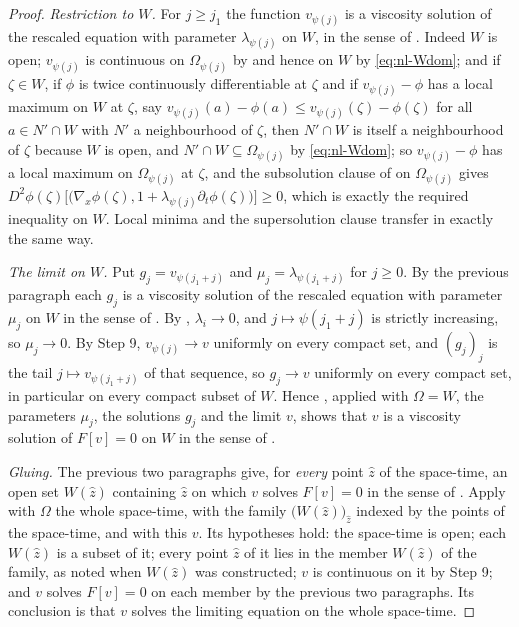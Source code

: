 \begin{proof}
\emph{Restriction to $W$.} For $j\ge j_1$ the function $v_{\psi(j)}$ is a
viscosity solution of the rescaled equation with parameter $\lambda_{\psi(j)}$ on
$W$, in the sense of . Indeed $W$ is open;
$v_{\psi(j)}$ is continuous on $\Omega_{\psi(j)}$ by
 and hence on $W$ by \eqref{eq:nl-Wdom}; and if
$\zeta\in W$, if $\phi$ is twice continuously differentiable at $\zeta$ and if
$v_{\psi(j)}-\phi$ has a local maximum on $W$ at $\zeta$, say
$v_{\psi(j)}(a)-\phi(a)\le v_{\psi(j)}(\zeta)-\phi(\zeta)$ for all
$a\in N'\cap W$ with $N'$ a neighbourhood of $\zeta$, then $N'\cap W$ is itself a
neighbourhood of $\zeta$ because $W$ is open, and $N'\cap W\subseteq
\Omega_{\psi(j)}$ by \eqref{eq:nl-Wdom}; so $v_{\psi(j)}-\phi$ has a local
maximum on $\Omega_{\psi(j)}$ at $\zeta$, and the subsolution clause of
 on $\Omega_{\psi(j)}$ gives
$D^2\phi(\zeta)\bigl[\bigl(\nabla_x\phi(\zeta),
1+\lambda_{\psi(j)}\partial_t\phi(\zeta)\bigr)\bigr]\ge0$, which is exactly the
required inequality on $W$.
Local minima and the supersolution clause transfer in exactly the same way.

\emph{The limit on $W$.} Put $g_j=v_{\psi(j_1+j)}$ and
$\mu_j=\lambda_{\psi(j_1+j)}$ for $j\ge0$. By the previous paragraph each $g_j$
is a viscosity solution of the rescaled equation with parameter $\mu_j$ on $W$
in the sense of . By ,
$\lambda_i\to0$, and $j\mapsto\psi(j_1+j)$ is strictly increasing, so
$\mu_j\to0$. By Step 9, $v_{\psi(j)}\to v$ uniformly on every compact set, and
$(g_j)_j$ is the tail $j\mapsto v_{\psi(j_1+j)}$ of that sequence, so
$g_j\to v$ uniformly on every compact set, in particular on every compact subset
of $W$. Hence , applied with $\Omega=W$, the
parameters $\mu_j$, the solutions $g_j$ and the limit $v$, shows that $v$ is a
viscosity solution of $F[v]=0$ on $W$ in the sense of
.

\emph{Gluing.} The previous two paragraphs give, for \emph{every} point $\hat z$
of the space-time, an open set $W(\hat z)$ containing $\hat z$ on which $v$
solves $F[v]=0$ in the sense of . Apply
 with $\Omega$ the whole space-time, with the
family $\bigl(W(\hat z)\bigr)_{\hat z}$ indexed by the points of the space-time, and
with this $v$. Its hypotheses hold: the space-time is open; each $W(\hat z)$ is a
subset of it; every point $\hat z$ of it lies in the member $W(\hat z)$ of the
family, as noted when $W(\hat z)$ was constructed; $v$ is continuous on it by
Step 9; and $v$ solves $F[v]=0$ on each member by the previous two paragraphs. Its
conclusion is that $v$ solves the limiting equation on the whole space-time.


\end{proof}
